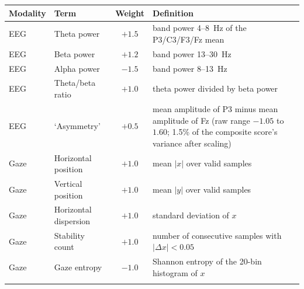 \documentclass[pdflatex,sn-basic,Numbered]{sn-jnl}
\makeatletter
\newenvironment{suptable}{\par\bigskip\noindent\begin{minipage}{\textwidth}\def\@captype{table}\centering\tablebodyfont}{\end{minipage}\par\bigskip}
\makeatother
\begin{document}
\begin{suptable}
\caption{Composition of the engagement label, a rule constructed by the authors from the recordings (Sections~2.2 and~4.1; \texttt{engagement\_phase3d.py}, which reproduces the held-out labels 347/347). Each term is computed per 5~s epoch, min--max normalised over the pooled epochs of all subjects, weighted and summed; the composite is thresholded at the pooled median (193 HIGH, 192 LOW). EEG terms use the mean of P3, C3, F3 and Fz (named `frontal' by the pipeline); gaze terms use the epoch's own normalised gaze samples; pupil diameter is not used. Table~S15 gives the linear recoverability from each group of terms.}\label{tabS5}
\small
\setlength{\tabcolsep}{3pt}\begin{tabular*}{\linewidth}{@{\extracolsep{\fill}}llcp{5.6cm}@{}}
\toprule
Modality & Term & Weight & Definition \\
\midrule
EEG & Theta power & $+1.5$ & band power 4--8~Hz of the P3/C3/F3/Fz mean \\
EEG & Beta power & $+1.2$ & band power 13--30~Hz \\
EEG & Alpha power & $-1.5$ & band power 8--13~Hz \\
EEG & Theta/beta ratio & $+1.0$ & theta power divided by beta power \\
EEG & `Asymmetry' & $+0.5$ & mean amplitude of P3 minus mean amplitude of Fz (raw range $-1.05$ to $1.60$; 1.5\% of the composite score's variance after scaling) \\
Gaze & Horizontal position & $+1.0$ & mean $|x|$ over valid samples \\
Gaze & Vertical position & $+1.0$ & mean $|y|$ over valid samples \\
Gaze & Horizontal dispersion & $+1.0$ & standard deviation of $x$ \\
Gaze & Stability count & $+1.0$ & number of consecutive samples with $|\Delta x|<0.05$ \\
Gaze & Gaze entropy & $-1.0$ & Shannon entropy of the 20-bin histogram of $x$ \\
\botrule
\end{tabular*}
\end{suptable}
\end{document}
